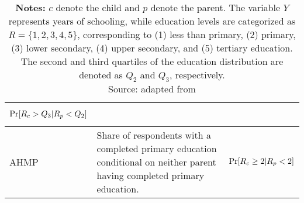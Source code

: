 \begin{table}[!ht]
\begin{tabular}{|m{}|m{}|m{}|}
    \begin{equation*}
    \operatorname{Pr}[ R_{c}  >Q_{3} |R_{p} < Q_{2}]
    \vspace{-1em}\end{equation*} \tabularnewline
    \hline
    \centering AHMP & \raggedright Share of respondents with a completed primary education conditional on neither parent having completed primary education. & \centering
    \begin{equation*}
    \operatorname{Pr}[ R_{c} \geq 2|R_{p} < 2]
    \vspace{-1em}\end{equation*} \tabularnewline
    \hline
    \end{tabular}
    \vspace{0.2cm}
    \label{tab:measures}
    \captionsetup{font=footnotesize}
    \caption*{\textbf{Notes:} \( c \) denote the child and \( p \) denote the parent. The variable \( Y \) represents years of schooling, while education levels are categorized as \( R = \{1,2,3,4,5\} \), corresponding to (1) less than primary, (2) primary, (3) lower secondary, (4) upper secondary, and (5) tertiary education. The second and third quartiles of the education distribution are denoted as \( Q_2 \) and \( Q_3 \), respectively.\\
    Source: adapted from \citet{van2024intergenerational}}
\end{table}
